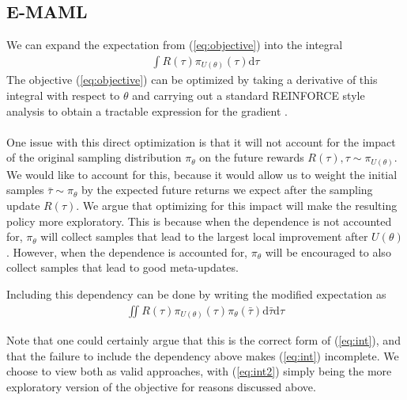 \documentclass{article} %
\begin{document}
\subsection{E-MAML} 

We can expand the expectation from (\ref{eq:objective}) into the integral 
\begin{align}
\int R(\tau) \pi_{U(\theta)} (\tau)\mathrm{d}\tau \label{eq:int}
\end{align} 
The objective (\ref{eq:objective}) can be optimized by taking a derivative of this integral with respect to $\theta$ and carrying out a standard REINFORCE style analysis to obtain a tractable expression for the gradient \cite{reinforce}. \\
\\
One issue with this direct optimization is that it will not account for the impact of the original sampling distribution $\pi_\theta$ on the future rewards $R(\tau), \tau \sim \pi_{U(\theta)}$. We would like to account for this, because it would allow us to weight the initial samples $\bar{\tau} \sim \pi_\theta$ by the expected future returns we expect after the sampling update $R(\tau)$. We argue that optimizing for this impact will make the resulting policy more exploratory. This is because when the dependence is not accounted for, $\pi_\theta$ will collect samples that lead to the largest local improvement after $U(\theta)$. However, when the dependence is accounted for, $\pi_\theta$ will be encouraged to also collect samples that lead to good meta-updates. %

Including this dependency can be done by writing the modified expectation as
\begin{align}
\iint R(\tau) \pi_{U(\theta)} (\tau) \pi_\theta (\bar{\tau})  \mathrm{d} \bar{\tau} \mathrm{d} \tau \label{eq:int2}
\end{align}

Note that one could certainly argue that this is the correct form of (\ref{eq:int}), and that the failure to include the dependency above makes (\ref{eq:int}) incomplete. We choose to view both as valid approaches, with (\ref{eq:int2}) simply being the more exploratory version of the objective for reasons discussed above. 
\end{document}
